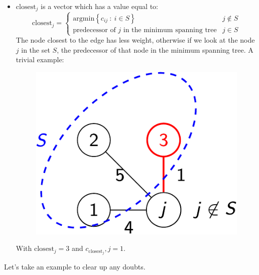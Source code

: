 \begin{itemize}
    \item $\text{closest}_{j}$ is a vector which has a value equal to:
    \begin{equation*}
        \text{closest}_{j} = \begin{cases}
            \mathrm{argmin}\left\{c_{ij} \: : \: i \in S\right\} & j \notin S \\
            \text{predecessor of }j\text{ in the minimum spanning tree} & j \in S
        \end{cases}
    \end{equation*}
    The node closest to the edge has less weight, otherwise if we look at the node $j$ in the set $S$, the predecessor of that node in the minimum spanning tree. A trivial example:
    \begin{figure}[!htp]
        \centering
        \includegraphics[width=.3\textwidth]{img/prims-alg-7.pdf}
    \end{figure}
    
    With $\mathrm{closest}_{j} = 3$ and $c_{\mathrm{closest}_{j}},j = 1$.
\end{itemize}
Let's take an example to clear up any doubts.


